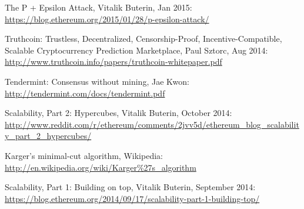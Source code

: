 \documentclass[11pt,a4paper]{report}
\theoremstyle{plain}
\theoremstyle{definition}
\theoremstyle{remark}
\begin{document}
\begin{thebibliography}{2}
    The P + Epsilon Attack, Vitalik Buterin, Jan 2015: \url{https://blog.ethereum.org/2015/01/28/p-epsilon-attack/}

    Truthcoin: Trustless, Decentralized, Censorship-Proof, Incentive-Compatible, Scalable Cryptocurrency Prediction Marketplace, Paul Sztorc, Aug 2014: \url{http://www.truthcoin.info/papers/truthcoin-whitepaper.pdf}

    Tendermint: Consensus without mining, Jae Kwon: \url{http://tendermint.com/docs/tendermint.pdf}

    Scalability, Part 2: Hypercubes, Vitalik Buterin, October 2014: \url{http://www.reddit.com/r/ethereum/comments/2jvv5d/ethereum_blog_scalability_part_2_hypercubes/}

    Karger's minimal-cut algorithm, Wikipedia: \url{http://en.wikipedia.org/wiki/Karger%27s_algorithm}

    Scalability, Part 1: Building on top, Vitalik Buterin, September 2014: \url{https://blog.ethereum.org/2014/09/17/scalability-part-1-building-top/}

\end{thebibliography}
\end{document}
